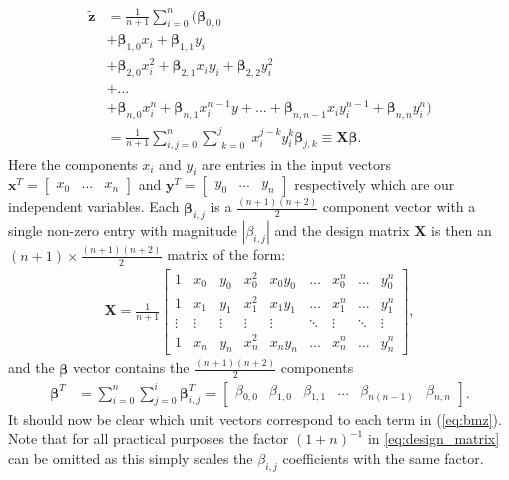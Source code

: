 \documentclass[%
reprint,
amsmath,amssymb,
aps,
pra,
]{revtex4-2}
\newcommand{\f}[2]{\frac{#1}{#2}}
\begin{document}
\begin{align}
	\tilde{\bm{z}}&=\f1{n+1}\sum_{i=0}^{n}\bigg(\bm\beta_{0,0}\nonumber\\
	&+\bm\beta_{1,0}x_i+\bm\beta_{1,1}y_i\nonumber\\
	&+\bm\beta_{2,0}x_i^2+\bm\beta_{2,1}x_iy_i+\bm\beta_{2,2}y_i^2\nonumber\\
	&+...\nonumber\\
	&+\bm\beta_{n,0}x_i^n+\bm\beta_{n,1}x_i^{n-1}y+...+\bm\beta_{n,n-1}x_iy_i^{n-1}+\bm\beta_{n,n}y_i^n\bigg)\nonumber\\
	&=\frac{1}{n+1}\sum_{i,j=0}^{n}\sum_{\substack{k=0}}^{j}x^{j-k}_i y^{k}_i\bm\beta_{j,k}\equiv \bm X\bm\beta.
	\label{eq:bmz}
\end{align}
Here the components $x_i$ and $y_i$ are entries in the input vectors $\bm x^T=\begin{bmatrix} x_0&...&x_n \end{bmatrix}$ and $\bm y^T=\begin{bmatrix} y_0& ...&y_n \end{bmatrix}$ respectively which are our independent variables. Each $\bm\beta_{i,j}$ is a $\frac{(n+1)(n+2)}{2}$ component vector with a single non-zero entry with magnitude $|\beta_{i,j}|$ and the design matrix $\bm X$ is then an $(n+1)\times\frac{(n+1)(n+2)}{2}$ matrix of the form:
\begin{align}
	\bm X=\frac{1}{n+1}\begin{bmatrix}
		1 & x_0 & y_0 & x^2_0 & x_0y_0 & ... & x_0^n & ... & y_0^n\\
		1 & x_1 & y_1 & x_1^2 & x_1y_1 & ... & x_1^n & ... & y_1^n\\
		\vdots & \vdots & \vdots & \vdots & \vdots & \ddots & \vdots & \ddots & \vdots\\
		1 & x_n & y_n & x_n^2 & x_ny_n & ... & x_n^n & ... & y_n^n
	\end{bmatrix},
	\label{eq:design_matrix}
\end{align}
and the $\bm\beta$ vector contains the $\frac{(n+1)(n+2)}{2}$ components 
\begin{align*}
	\bm\beta^T&=\sum_{i=0}^n\sum_{j=0}^i\bm\beta_{i,j}^T=\begin{bmatrix}
		\beta_{0,0}&\beta_{1,0}&\beta_{1,1}&...&\beta_{n(n-1)}&\beta_{n,n}
	\end{bmatrix}.
\end{align*}
It should now be clear which unit vectors correspond to each term in (\ref{eq:bmz}). Note that for all practical purposes the factor $(1+n)^{-1}$ in \eqref{eq:design_matrix} can be omitted as this simply scales the $\beta_{i,j}$ coefficients with the same factor.
\end{document}
